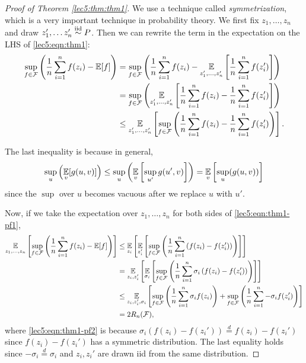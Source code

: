 \begin{proof}[Proof of Theorem \ref{lec5:thm:thm1}]
We use a technique called \textit{symmetrization}, which is a very important technique in probability theory. We first fix $z_1, \dots, z_n$and draw $ z_1', \dots z_n' \overset{\textup{iid}}{\sim} P$. Then we can rewrite the term in the expectation on the LHS of \eqref{lec5:eqn:thm1}:
\begin{align}
    \sup_{f \in \mathcal F} \left( \frac{1}{n} \sum^n_{i=1} f(z_i) - \operatorname*{\mathbb{E}}[f] \right) &= \sup_{f \in \mathcal F} \left( \frac{1}{n} \sum^n_{i=1} f(z_i) - \operatorname*{\mathbb{E}}_{z_1',\dots, z_n'} \left[ \frac{1}{n} \sum^n_{i=1} f(z_i')\right] \right) \\
    &= \sup_{f \in \mathcal F} \left( \operatorname*{\mathbb{E}}_{z_1',\dots, z_n'} \left[\frac{1}{n} \sum^n_{i=1} f(z_i) -  \frac{1}{n} \sum^n_{i=1} f(z_i')\right] \right)\\
    &\leq \operatorname*{\mathbb{E}}_{z_1',\dots, z_n'} \left[\sup_{f \in \mathcal F} \left( \frac{1}{n} \sum^n_{i=1} f(z_i) -  \frac{1}{n} \sum^n_{i=1} f(z_i')\right)\right]. \label{lec5:eqn:thm1-pf1}
\end{align}

The last inequality is because in general,
\begin{align}
    \sup_u \left(\operatorname*{\mathbb{E}}_v[g(u,v)]\right) \leq \sup_u \left( \operatorname*{\mathbb{E}}_v\left[\sup_{u'}g(u',v)\right]\right) = \operatorname*{\mathbb{E}}_v \left[\sup_u (g(u,v))\right]
\end{align}
since the $\sup$ over $u$ becomes vacuous after we replace $u$ with $u'$.

Now, if we take the expectation over $z_1, \dots, z_n$ for both sides of \eqref{lec5:eqn:thm1-pf1},
\begin{align}
    \operatorname*{\mathbb{E}}_{z_1, \dots, z_n} \left[\sup_{f \in \mathcal F} \left( \frac{1}{n} \sum^n_{i=1} f(z_i) - \operatorname*{\mathbb{E}}[f] \right) \right] 
    &\leq \operatorname*{\mathbb{E}}_{z_i} \left[ \operatorname*{\mathbb{E}}_{z_i'} \left[\sup_{f \in \mathcal F} \left( \frac{1}{n} \sum^n_{i=1} \left(f(z_i) -  f(z_i')\right)\right)\right]\right]\\
    &= \operatorname*{\mathbb{E}}_{z_i,z_i'} \left[ \operatorname*{\mathbb{E}}_{\sigma_i} \left[\sup_{f \in \mathcal F} \left( \frac{1}{n} \sum^n_{i=1} \sigma_i\left(f(z_i) -  f(z_i')\right)\right)\right]\right] \label{lec5:eqn:thm1-pf2} \\
 &\leq \operatorname*{\mathbb{E}}_{z_i,z_i', \sigma_i} \left[\sup_{f \in \mathcal F} \left( \frac{1}{n} \sum^n_{i=1} \sigma_i f(z_i)\right)+\sup_{f \in \mathcal F} \left( \frac{1}{n} \sum^n_{i=1} -\sigma_i f(z_i')\right)\right] \\
    &= 2R_n(\mathcal F),
\end{align}
where \eqref{lec5:eqn:thm1-pf2} is because $\sigma_i(f(z_i) - f(z_i')) \stackrel{d}{=} f(z_i) - f(z_i')$ since $f(z_i) - f(z_i')$ has a symmetric distribution. The last equality holds since $-\sigma_i \overset{d}{=} \sigma_i$ and $z_i, z_i'$ are drawn iid from the same distribution. 
\end{proof}

